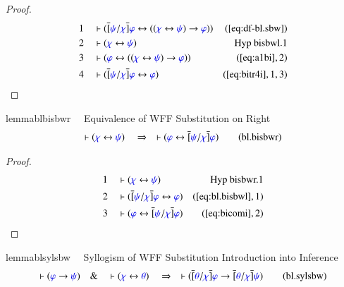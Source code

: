 \begin{proof}
\begin{align}
  1 &&  & \vdash ( \overline{[} \mw{\psi} / \mw{\chi} \overline{]} \mw{\varphi}
      \leftrightarrow ( ( \mw{\chi} \leftrightarrow
      \mw{\psi} ) \rightarrow \mw{\varphi} )
      )&(\mbox{\ref{eq:df-bl.sbw}})\notag
  \\ 2 &&  & \vdash ( \mw{\chi} \leftrightarrow \mw{\psi}
      )&\text{Hyp~bisbwl.1}\notag%
  \\ 3 &&  & \vdash ( \mw{\varphi} \leftrightarrow ( ( \mw{\chi}
      \leftrightarrow \mw{\psi} ) \rightarrow \mw{\varphi}
      ) )&(\mbox{\ref{eq:a1bi}},2)\notag
  \\ 4 &&  & \vdash ( \overline{[} \mw{\psi} / \mw{\chi} \overline{]}
      \mw{\varphi} \leftrightarrow \mw{\varphi}
      )&(\mbox{\ref{eq:bitr4i}},1,3)\notag
\end{align}
\end{proof}

\begin{restatable}{lemma}{blbisbwr}~~ Equivalence of WFF Substitution on Right
\begin{align}
\vdash ( \mw{\chi} \leftrightarrow \mw{\psi} )\quad\Rightarrow\quad \vdash (
    \mw{\varphi} \leftrightarrow \overline{[} \mw{\psi} / \mw{\chi}
    \overline{]} \mw{\varphi} )\label{eq:bl.bisbwr}\tag{bl.bisbwr}
\end{align}
\end{restatable}

\begin{proof}
\begin{align}
  1 &&  & \vdash ( \mw{\chi} \leftrightarrow \mw{\psi}
      )&\text{Hyp~bisbwr.1}\notag%
  \\ 2 &&  & \vdash ( \overline{[} \mw{\psi} / \mw{\chi} \overline{]}
      \mw{\varphi} \leftrightarrow \mw{\varphi}
      )&(\mbox{\ref{eq:bl.bisbwl}},1)\notag
  \\ 3 &&  & \vdash ( \mw{\varphi} \leftrightarrow \overline{[} \mw{\psi} /
      \mw{\chi} \overline{]} \mw{\varphi}
      )&(\mbox{\ref{eq:bicomi}},2)\notag
\end{align}
\end{proof}

\begin{restatable}{lemma}{blsylsbw}~~ Syllogism of WFF Substitution
Introduction into Inference
\begin{align}
\vdash ( \mw{\varphi} \rightarrow \mw{\psi} )\quad\&\quad \vdash ( \mw{\chi}
    \leftrightarrow \mw{\theta} )\quad\Rightarrow\quad \vdash ( \overline{[}
    \mw{\theta} / \mw{\chi} \overline{]} \mw{\varphi} \rightarrow \overline{[}
    \mw{\theta} / \mw{\chi} \overline{]} \mw{\psi}
    )\label{eq:bl.sylsbw}\tag{bl.sylsbw}
\end{align}
\end{restatable}

